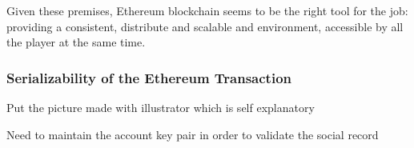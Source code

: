 Given these premises, Ethereum blockchain seems to be the right tool for the job: providing a consistent, distribute and scalable and environment, accessible by all the player at the same time.



\subsubsection{Serializability of the Ethereum Transaction}

Put the picture made with illustrator which is self explanatory


\begin{notation}
  Need to maintain the account key pair in order to validate the social record
\end{notation}